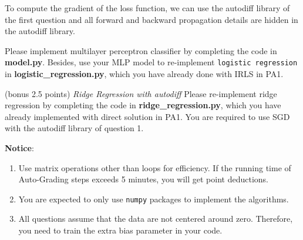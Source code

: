 \documentclass[a4paper, 12pt]{exam}
\begin{document}
\begin{questions}
		To compute the gradient of the loss function, we can use the autodiff library of the first question and all forward and backward propagation details
		are hidden in the autodiff library.

		Please implement multilayer perceptron classifier by completing the code in \textbf{model.py}.
		Besides, use your MLP model to re-implement \texttt{logistic regression} in \linebreak[4] \textbf{logistic\_regression.py}, which you have already done with IRLS in PA1.
		
		\question (bonus 2.5 points) \emph{Ridge Regression with autodiff}
		Please re-implement ridge regression by completing the code in \textbf{ridge\_regression.py}, which you have already implemented with direct solution in PA1.
		You are required to use SGD with the autodiff library of question 1.
	\end{questions}
	
	
	\nocite{*}
	\begin{flushleft}
		\textbf{Notice}: \\
		\begin{enumerate}
			\item Use matrix operations other than loops for efficiency. If the running time of Auto-Grading steps exceeds 5 minutes, you will get point deductions.
			\item You are expected to only use \texttt{numpy} packages to implement the algorithms.
			\item All questions assume that the data are not centered around zero. Therefore, you need to train the extra bias parameter in your code.
		\end{enumerate}
	\end{flushleft}
	
\end{document}
